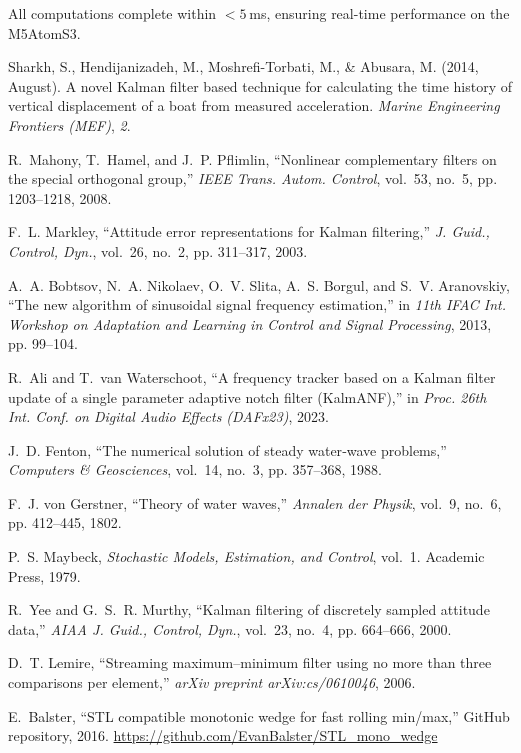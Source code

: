 \documentclass[11pt,letterpaper]{article}
\begin{document}
All computations complete within \(<5\) ms, ensuring real-time performance on the M5AtomS3.

\begin{thebibliography}{10}

Sharkh, S., Hendijanizadeh, M., Moshrefi-Torbati, M., \& Abusara, M. (2014, August). 
A novel Kalman filter based technique for calculating the time history of vertical displacement of a boat from measured acceleration. 
\textit{Marine Engineering Frontiers (MEF)}, \textit{2}.

R.~Mahony, T.~Hamel, and J.~P. Pflimlin, “Nonlinear complementary filters on the special orthogonal group,” \emph{IEEE Trans. Autom. Control}, vol.~53, no.~5, pp. 1203–1218, 2008.

F.~L. Markley, “Attitude error representations for Kalman filtering,” \emph{J. Guid., Control, Dyn.}, vol.~26, no.~2, pp. 311–317, 2003.

A.~A. Bobtsov, N.~A. Nikolaev, O.~V. Slita, A.~S. Borgul, and S.~V. Aranovskiy, “The new algorithm of sinusoidal signal frequency estimation,” in \emph{11th IFAC Int. Workshop on Adaptation and Learning in Control and Signal Processing}, 2013, pp. 99–104.

R.~Ali and T.~van Waterschoot, “A frequency tracker based on a Kalman filter update of a single parameter adaptive notch filter (KalmANF),” in \emph{Proc. 26th Int. Conf. on Digital Audio Effects (DAFx23)}, 2023.

J.~D. Fenton, “The numerical solution of steady water‐wave problems,” \emph{Computers \& Geosciences}, vol.~14, no.~3, pp. 357–368, 1988.

F.~J. von Gerstner, “Theory of water waves,” \emph{Annalen der Physik}, vol.~9, no.~6, pp. 412–445, 1802.

P.~S. Maybeck, \emph{Stochastic Models, Estimation, and Control}, vol.~1. Academic Press, 1979.

R.~Yee and G.~S.~R. Murthy, “Kalman filtering of discretely sampled attitude data,” \emph{AIAA J. Guid., Control, Dyn.}, vol.~23, no.~4, pp. 664–666, 2000.

D.~T. Lemire, “Streaming maximum–minimum filter using no more than three comparisons per element,” \emph{arXiv preprint arXiv:cs/0610046}, 2006.

E.~Balster, “STL compatible monotonic wedge for fast rolling min/max,” GitHub repository, 2016. \url{https://github.com/EvanBalster/STL_mono_wedge}

\end{thebibliography}
\end{document}
